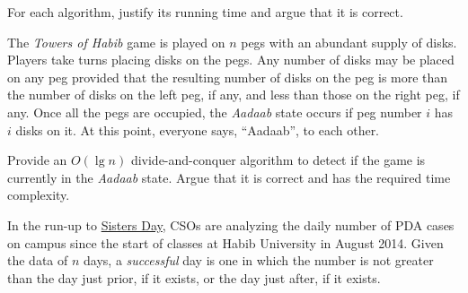 \documentclass[addpoints]{exam}
\begin{document}
\begin{questions}
  For each algorithm, justify its running time and argue that it is correct.
  
  \begin{solution}
    \begin{parts}
      \part
      \part
    \end{parts}
  \end{solution}
  
  \question[5] The \textit{Towers of Habib} game is played on $n$ pegs with an abundant supply of disks. Players take turns placing disks on the pegs. Any number of disks may be placed on any peg provided that the resulting number of disks on the peg is more than the number of disks on the left peg, if any, and less than those on the right peg, if any. Once all the pegs are occupied, the \textit{Aadaab} state occurs if peg number $i$ has $i$ disks on it. At this point, everyone says, ``Aadaab'', to each other.

  Provide an $O(\lg n)$ divide-and-conquer algorithm to detect if the game is currently in the \textit{Aadaab} state. Argue that it is correct and has the required time complexity.

  \begin{solution}
  \end{solution}

  \question[5] In the run-up to \href{https://en.dailypakistan.com.pk/13-Jan-2019/this-pakistani-varsity-will-celebrate-feb-14-as-sister-s-day}{Sisters Day}, CSOs are analyzing the daily number of PDA cases on campus since the start of classes at Habib University in August 2014. Given the data of $n$ days, a \textit{successful} day is one in which the number is not greater than the day just prior, if it exists, or the day just after, if it exists.


\end{questions}
\end{document}
